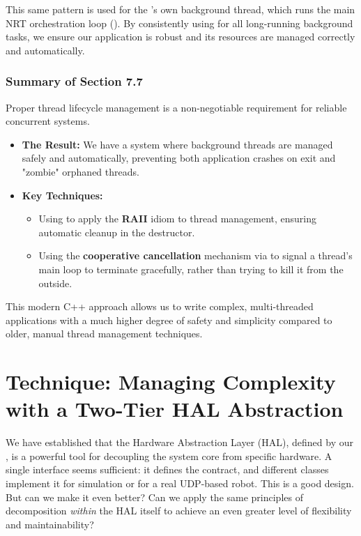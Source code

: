 This same pattern is used for the 's own background thread, which runs the main NRT orchestration loop (). By consistently using  for all long-running background tasks, we ensure our application is robust and its resources are managed correctly and automatically.

\subsubsection{Summary of Section 7.7}
\label{subsubsec:section7-7_summary}
Proper thread lifecycle management is a non-negotiable requirement for reliable concurrent systems.
\begin{itemize}
    \item \textbf{The Result:} We have a system where background threads are managed safely and automatically, preventing both application crashes on exit and "zombie" orphaned threads.
    \item \textbf{Key Techniques:}
    \begin{itemize}
        \item Using \textbf{} to apply the \textbf{RAII} idiom to thread management, ensuring automatic cleanup in the destructor.
        \item Using the \textbf{cooperative cancellation} mechanism via  to signal a thread's main loop to terminate gracefully, rather than trying to kill it from the outside.
    \end{itemize}
\end{itemize}
This modern C++ approach allows us to write complex, multi-threaded applications with a much higher degree of safety and simplicity compared to older, manual thread management techniques.









\section{Technique: Managing Complexity with a Two-Tier HAL Abstraction}
\label{sec:technique_two_tier_hal}

We have established that the Hardware Abstraction Layer (HAL), defined by our , is a powerful tool for decoupling the system core from specific hardware. A single interface seems sufficient: it defines the contract, and different classes implement it for simulation or for a real UDP-based robot. This is a good design. But can we make it even better? Can we apply the same principles of decomposition \textit{within} the HAL itself to achieve an even greater level of flexibility and maintainability?

